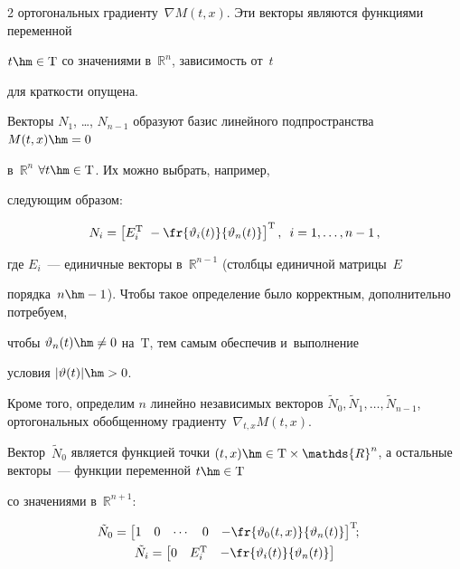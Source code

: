 \begin{multicols}{2}
ортогональных градиенту~$\nabla M(t,x)$. Эти векторы являются функциями переменной 

$t \hm\in \mathrm{T}$ со значениями в~$\mathds{R}^n$, зависимость от~$t$ 

для краткости опущена.



Векторы $N_1$, \dots, $N_{n-1}$ образуют базис линейного подпространства $M(t,x) \hm= 0$ 

в~$\mathds{R}^n$ $\forall t \hm\in \mathrm{T}$. Их можно выбрать, например, 

следующим образом:

$$

  N_i = \left[ E_i^\trans \  -\fr{\vartheta_i(t)}{\vartheta_n(t)} \right]^\trans,\enskip

  i = 1,\dots,n-1\,,

$$

где $E_i$~--- единичные векторы в~$\mathds{R}^{n-1}$ (столбцы единичной матрицы~$E$ 

порядка~$n\hm-1$). Чтобы такое определение было корректным, дополнительно потребуем,

 чтобы $\vartheta_n(t) \hm\neq 0$ на~$\mathrm{T}$, тем самым обеспечив и~выполнение 

 условия $|\vartheta(t)| \hm> 0$.



Кроме того, определим $n$ линейно независимых векторов $\tilde N_0, \tilde N_1, \dots, 

\tilde N_{n-1}$, ортогональных обобщенному градиенту~$\nabla_{t,x} M(t,x)$. 

Вектор~$\tilde N_0$ является функцией точки $(t,x) \hm\in \mathrm{T} \times 

\mathds{R}^n$, а остальные векторы~--- функции переменной $t \hm\in \mathrm{T}$ 

со значениями в~$\mathds{R}^{n+1}$:

\begin{multline*}

  \!\!\!\!\!\!\tilde N_0 = \begin{bmatrix} 1 &  0 &  \cdots  & 0 &  

  -\fr{\vartheta_0(t,x)}{\vartheta_n(t)} 

\end{bmatrix}^\trans\!\!; \\

  \tilde N_i = \begin{bmatrix}

   0 &  E_i^\trans &  -\fr{\vartheta_i(t)}{\vartheta_n(t)}  


\end{bmatrix}
\end{multline*}
\end{multicols}
